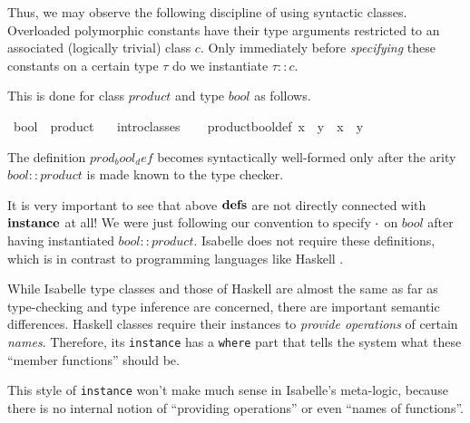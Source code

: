 \begin{isabelle}
\begin{isamarkuptext}
 \medskip Thus, we may observe the following discipline of using
 syntactic classes.  Overloaded polymorphic constants have their type
 arguments restricted to an associated (logically trivial) class $c$.
 Only immediately before \emph{specifying} these constants on a
 certain type $\tau$ do we instantiate $\tau :: c$.

 This is done for class $product$ and type $bool$ as follows.%
\end{isamarkuptext}%
\ bool\ {\isacharcolon}{\isacharcolon}\ product\isanewline
\ \ \ intro{\isacharunderscore}classes\isanewline
{}\ {\isacharparenleft}\isanewline
\ \ product{\isacharunderscore}bool{\isacharunderscore}def{\isacharcolon}\ {\isachardoublequote}x\ {\isasymOtimes}\ y\ {\isasymequiv}\ x\ {\isasymand}\ y{\isachardoublequote}%
\begin{isamarkuptext}%
The definition $prod_bool_def$ becomes syntactically well-formed only
 after the arity $bool :: product$ is made known to the type checker.

 \medskip It is very important to see that above ${\mathord{\mathbf{defs}}}$ are not
 directly connected with ${\mathord{\mathbf{instance}}}$ at all!  We were
 just following our convention to specify $\cdot$ on $bool$ after
 having instantiated $bool :: product$.  Isabelle does not require
 these definitions, which is in contrast to programming languages like
 Haskell \cite{haskell-report}.

 \medskip While Isabelle type classes and those of Haskell are almost
 the same as far as type-checking and type inference are concerned,
 there are important semantic differences.  Haskell classes require
 their instances to \emph{provide operations} of certain \emph{names}.
 Therefore, its \texttt{instance} has a \texttt{where} part that tells
 the system what these ``member functions'' should be.

 This style of \texttt{instance} won't make much sense in Isabelle's
 meta-logic, because there is no internal notion of ``providing
 operations'' or even ``names of functions''.%
\end{isamarkuptext}%
\end{isabelle}%
